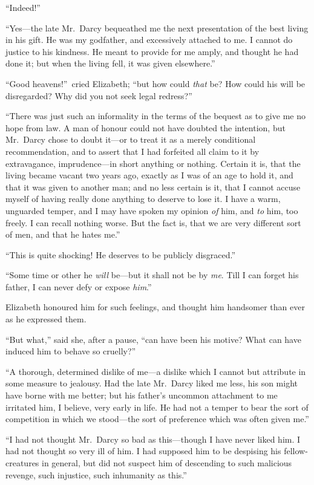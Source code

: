\documentclass[12pt,english,oneside]{book}
\begin{document}
{}``Indeed!''\


{}``Yes\mbox{---}the late Mr.\ Darcy bequeathed me the next presentation
of the best living in his gift. He was my godfather, and excessively
attached to me. I cannot do justice to his kindness. He meant to provide
for me amply, and thought he had done it; but when the living fell,
it was given elsewhere.''

{}``Good heavens!''\ cried Elizabeth; {}``but how could \textit{that}
be? How could his will be disregarded? Why did you not seek legal
redress?''\ 

{}``There was just such an informality in the terms of the bequest
as to give me no hope from law. A man of honour could not have doubted
the intention, but Mr.\ Darcy chose to doubt it\mbox{---}or to treat
it as a merely conditional recommendation, and to assert that I had
forfeited all claim to it by extravagance, imprudence---in short anything
or nothing. Certain it is, that the living became vacant two years
ago, exactly as I was of an age to hold it, and that it was given
to another man; and no less certain is it, that I cannot accuse myself
of having really done anything to deserve to lose it. I have a warm,
unguarded temper, and I may have spoken my opinion \textit{of} him,
and \textit{to} him, too freely. I can recall nothing worse. But the
fact is, that we are very different sort of men, and that he hates
me.''

{}``This is quite shocking! He deserves to be publicly disgraced.''

{}``Some time or other he \textit{will} be\mbox{---}but it shall
not be by \textit{me}. Till I can forget his father, I can never defy
or expose \textit{him}.''

Elizabeth honoured him for such feelings, and thought him handsomer
than ever as he expressed them.

{}``But what,'' said she, after a pause, {}``can have been his
motive? What can have induced him to behave so cruelly?''\ 

{}``A thorough, determined dislike of me\mbox{---}a dislike which
I cannot but attribute in some measure to jealousy. Had the late Mr.\ Darcy
liked me less, his son might have borne with me better; but his father's
uncommon attachment to me irritated him, I believe, very early in
life. He had not a temper to bear the sort of competition in which
we stood\mbox{---}the sort of preference which was often given me.''

{}``I had not thought Mr.\ Darcy so bad as this\mbox{---}though
I have never liked him. I had not thought so very ill of him. I had
supposed him to be despising his fellow-creatures in general, but
did not suspect him of descending to such malicious revenge, such
injustice, such inhumanity as this.''
\end{document}

